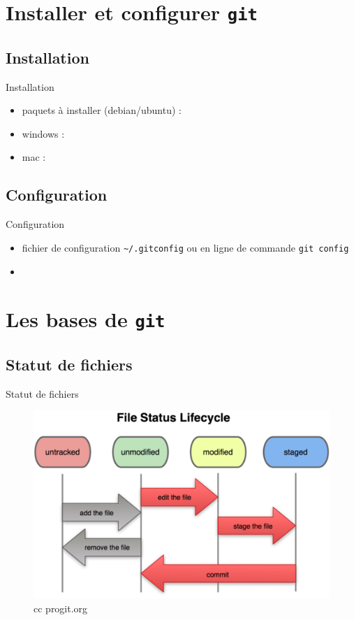 \documentclass{beamer}
\newcommand{\git}{\texttt{git}}
\begin{document}
\section{Installer et configurer \git}

\subsection*{Installation}
\begin{frame}{Installation}
  \begin{itemize}
  \item paquets à installer (debian/ubuntu) :
  \item windows :
  \item mac :
  \end{itemize}
\end{frame}

\subsection*{Configuration}
\begin{frame}[containsverbatim]{Configuration}
  \begin{itemize}
  \item fichier de configuration \lstinline|~/.gitconfig| ou en ligne de commande \lstinline|git config|
  \item
  \end{itemize}
\end{frame}

\section{Les bases de \git}
\subsection*{Statut de fichiers}
\begin{frame}{Statut de fichiers}
  \begin{figure}
    \begin{center}
      \includegraphics[scale=0.7]{img/Status_lifecycle.png}
    \end{center}
    \tiny
    \caption{cc progit.org}
    \label{cc progit.org}
  \end{figure}
\end{frame}
\end{document}
